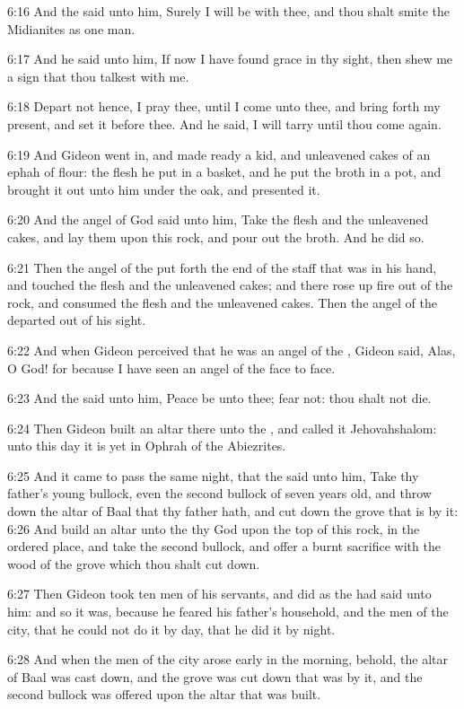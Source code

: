 6:16 And the \LORD said unto him, Surely I will be with thee, and thou
shalt smite the Midianites as one man.

6:17 And he said unto him, If now I have found grace in thy sight,
then shew me a sign that thou talkest with me.

6:18 Depart not hence, I pray thee, until I come unto thee, and bring
forth my present, and set it before thee. And he said, I will tarry
until thou come again.

6:19 And Gideon went in, and made ready a kid, and unleavened cakes of
an ephah of flour: the flesh he put in a basket, and he put the broth
in a pot, and brought it out unto him under the oak, and presented it.

6:20 And the angel of God said unto him, Take the flesh and the
unleavened cakes, and lay them upon this rock, and pour out the broth.
And he did so.

6:21 Then the angel of the \LORD put forth the end of the staff that
was in his hand, and touched the flesh and the unleavened cakes; and
there rose up fire out of the rock, and consumed the flesh and the
unleavened cakes. Then the angel of the \LORD departed out of his
sight.

6:22 And when Gideon perceived that he was an angel of the \LORD,
Gideon said, Alas, O \LORD God! for because I have seen an angel of the
\LORD face to face.

6:23 And the \LORD said unto him, Peace be unto thee; fear not: thou
shalt not die.

6:24 Then Gideon built an altar there unto the \LORD, and called it
Jehovahshalom: unto this day it is yet in Ophrah of the Abiezrites.

6:25 And it came to pass the same night, that the \LORD said unto him,
Take thy father's young bullock, even the second bullock of seven
years old, and throw down the altar of Baal that thy father hath, and
cut down the grove that is by it: 6:26 And build an altar unto the
\LORD thy God upon the top of this rock, in the ordered place, and take
the second bullock, and offer a burnt sacrifice with the wood of the
grove which thou shalt cut down.

6:27 Then Gideon took ten men of his servants, and did as the \LORD had
said unto him: and so it was, because he feared his father's
household, and the men of the city, that he could not do it by day,
that he did it by night.

6:28 And when the men of the city arose early in the morning, behold,
the altar of Baal was cast down, and the grove was cut down that was
by it, and the second bullock was offered upon the altar that was
built.

